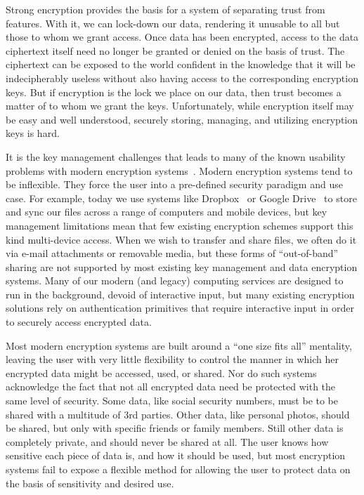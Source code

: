 Strong encryption provides the basis for a system of separating trust
from features. With it, we can lock-down our data, rendering it
unusable to all but those to whom we grant access. Once data has been
encrypted, access to the data ciphertext itself need no longer be
granted or denied on the basis of trust. The ciphertext can be exposed
to the world confident in the knowledge that it will be indecipherably
useless without also having access to the corresponding encryption
keys. But if encryption is the lock we place on our data, then trust
becomes a matter of to whom we grant the keys. Unfortunately, while
encryption itself may be easy and well understood, securely storing,
managing, and utilizing encryption keys is hard.

It is the key management challenges that leads to many of the known
usability problems with modern encryption systems~\cite{Whitten1999,
  Sweikata2009, Kher2005}. Modern encryption systems tend to be
inflexible. They force the user into a pre-defined security paradigm
and use case. For example, today we use systems like
Dropbox~\cite{dropbox} or Google Drive~\cite{google-drive} to store
and sync our files across a range of computers and mobile devices, but
key management limitations mean that few existing encryption schemes
support this kind multi-device access. When we wish to transfer and
share files, we often do it via e-mail attachments or removable media,
but these forms of ``out-of-band'' sharing are not supported by most
existing key management and data encryption systems. Many of our
modern (and legacy) computing services are designed to run in the
background, devoid of interactive input, but many existing encryption
solutions rely on authentication primitives that require interactive
input in order to securely access encrypted data.

Most modern encryption systems are built around a ``one size fits
all'' mentality, leaving the user with very little flexibility to
control the manner in which her encrypted data might be accessed,
used, or shared. Nor do such systems acknowledge the fact that not
all encrypted data need be protected with the same level of
security. Some data, like social security numbers, must be to be
shared with a multitude of 3rd parties. Other data, like personal
photos, should be shared, but only with specific friends or family
members. Still other data is completely private, and should never be
shared at all. The user knows how sensitive each piece of data is, and
how it should be used, but most encryption systems fail to expose a
flexible method for allowing the user to protect data on the basis of
sensitivity and desired use.

